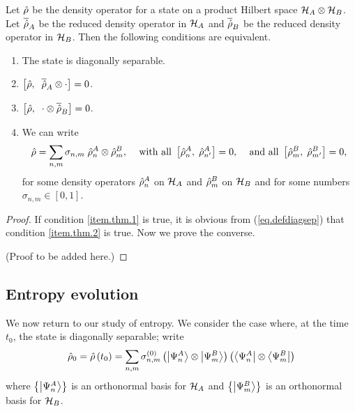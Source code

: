\begin{theorem}
Let \(\hat{\rho}\) be the density operator for a state on a product Hilbert space \(\mathcal{H}_A \otimes \mathcal{H}_B\). Let \(\overline{\hat{\rho}}_A\) be the reduced density operator in \(\mathcal{H}_A\) and \(\overline{\hat{\rho}}_B\) be the reduced density operator in \(\mathcal{H}_B\). Then the following conditions are equivalent.
\begin{enumerate}  
    \item\label{item.thm.1}
    The state is diagonally separable.
    \item\label{item.thm.2}
    \(\left[\hat{\rho},\;\; \overline{\hat{\rho}}_A\otimes\cdot\right] = 0\).
    \item\label{item.thm.3}
    \(\left[\hat{\rho},\;\; \cdot\otimes\overline{\hat{\rho}}_B\right] = 0\).
    \item\label{item.thm.4}
    We can write
    \begin{align*}
    \hat{\rho} &= \sum_{n,m}\sigma_{n,m}\; \hat{\rho}_n^A \otimes \hat{\rho}_m^B, &
    \text{ with all } \left[\hat{\rho}_n^A, \;\hat{\rho}_{n^\prime}^A\right]&=0, &
    \text{ and all } \left[\hat{\rho}_m^B, \;\hat{\rho}_{m^\prime}^B\right]=0,
    \end{align*}
    for some density operators \(\hat{\rho}_n^A\) on \(\mathcal{H}_A\) and \(\hat{\rho}_m^B\) on \(\mathcal{H}_B\) and for some numbers \(\sigma_{n,m}\in[0,1]\).
\end{enumerate}
\end{theorem}

\begin{proof}
If condition \ref{item.thm.1} is true, it is obvious from (\ref{eq.defdiagsep}) that condition \ref{item.thm.2} is true. Now we prove the converse.

(Proof to be added here.)
\end{proof}

\subsection{Entropy evolution}

We now return to our study of entropy. We consider the case where, at the time \(t_0\), the state is diagonally separable; write
\begin{equation}\label{eq.rho0fullinitial}
\hat{\rho}_0 = \hat{\rho}\left(t_0\right) = \sum_{n,m} \sigma_{n,m}^{(0)} \left(\left|\Psi_n^{A}\right\rangle\otimes\left|\Psi_m^B\right\rangle\right) \left(\left\langle\Psi_n^{A}\right|\otimes\left\langle\Psi_m^B\right|\right)
\end{equation}
where \(\left\{\left|\Psi_n^{A}\right\rangle\right\}\) is an orthonormal basis for \(\mathcal{H}_A\) and \(\left\{\left|\Psi_m^B\right\rangle\right\}\) is an orthonormal basis for \(\mathcal{H}_B\).

